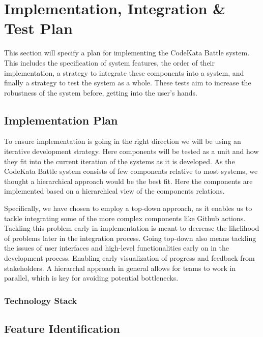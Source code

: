 \section{Implementation, Integration \& Test Plan}
This section will specify a plan for implementing the CodeKata Battle system. This includes the specification of system features, the order of their implementation, a strategy to integrate these components into a system, and finally a strategy to test the system as a whole. These tests aim to increase the robustness of the system before, getting into the user's hands. 

\subsection{Implementation Plan}
To ensure implementation is going in the right direction we will be using an iterative development strategy. Here components will be tested as a unit and how they fit into the current iteration of the systems as it is developed. As the CodeKata Battle system consists of few components relative to most systems, we thought a hierarchical approach would be the best fit. Here the components are implemented based on a hierarchical view of the components relations. 

Specifically, we have chosen to employ a top-down approach, as it enables us to tackle integrating some of the more complex components like Github actions. Tackling this problem early in implementation is meant to decrease the likelihood of problems later in the integration process. Going top-down also means tackling the issues of user interfaces and high-level functionalities early on in the development process. Enabling early visualization of progress and feedback from stakeholders. A hierarchal approach in general allows for teams to work in parallel, which is key for avoiding potential bottlenecks.


\subsubsection{Technology Stack}

\subsection{Feature Identification}

